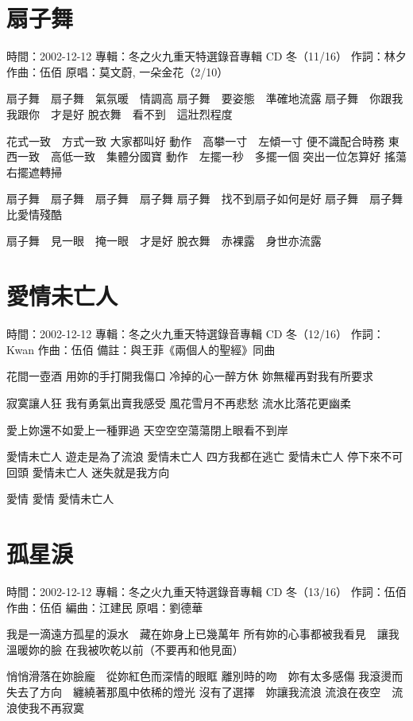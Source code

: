 \documentclass[UTF8,a4paper,oneside,twocolumn,12pt]{ctexbook}
\newcommand{\infopair}[2]{\textbullet #1：#2}
\newcommand{\zc}[1][伍佰]{\infopair{作詞}{#1}}
\newcommand{\zq}[1][伍佰]{\infopair{作曲}{#1}}
\newcommand{\bq}[1][伍佰]{\infopair{編曲}{#1}}
\newcommand{\zj}[1]{\infopair{專輯}{#1}}
\newcommand{\yc}[1]{\infopair{原唱}{#1}}
\newcommand{\sj}[1]{\infopair{時間}{#1}}
\newcommand{\bz}[1]{\infopair{備註}{#1}}
\newenvironment{info}{\begin{flushleft}\kaishu
	}
	{\end{flushleft}\normalsize\yahei\par}
\newenvironment{lyric}{
	}
{}
\begin{document}
\section{扇子舞}
\begin{info}
	\sj{2002-12-12}
	\zj{冬之火九重天特選錄音專輯 CD 冬（11/16）}
	\zc[林夕]
	\zq
	\yc{莫文蔚, 一朵金花（2/10）}
\end{info}
\begin{lyric}
	扇子舞　扇子舞　氣氛暖　情調高
	扇子舞　要姿態　準確地流露
	扇子舞　你跟我　我跟你　才是好
	脫衣舞　看不到　這壯烈程度

	花式一致　方式一致 大家都叫好
	動作　高攀一寸　左傾一寸 便不識配合時務
	東西一致　高低一致　集體分國寶
	動作　左擺一秒　多擺一個 突出一位怎算好
	搖蕩右擺遮轉掃

	扇子舞　扇子舞　扇子舞　扇子舞
	扇子舞　找不到扇子如何是好
	扇子舞　扇子舞比愛情殘酷

	扇子舞　見一眼　掩一眼　才是好
	脫衣舞　赤裸露　身世亦流露
\end{lyric}

\section{愛情未亡人}
\begin{info}
	\sj{2002-12-12}
	\zj{冬之火九重天特選錄音專輯 CD 冬（12/16）}
	\zc[Kwan]
	\zq
	\bz{與王菲《兩個人的聖經》同曲}
\end{info}
\begin{lyric}
	花間一壺酒 用妳的手打開我傷口
	冷掉的心一醉方休 妳無權再對我有所要求

	寂寞讓人狂 我有勇氣出賣我感受
	風花雪月不再悲愁 流水比落花更幽柔

	愛上妳還不如愛上一種罪過
	天空空空蕩蕩閉上眼看不到岸

	愛情未亡人 遊走是為了流浪
	愛情未亡人 四方我都在逃亡
	愛情未亡人 停下來不可回頭
	愛情未亡人 迷失就是我方向

	愛情 愛情 愛情未亡人
\end{lyric}

\section{孤星淚}
\begin{info}
	\sj{2002-12-12}
	\zj{冬之火九重天特選錄音專輯 CD 冬（13/16）}
	\zc
	\zq
	\bq[江建民]
	\yc{劉德華}
\end{info}
\begin{lyric}
	我是一滴遠方孤星的淚水　藏在妳身上已幾萬年
	所有妳的心事都被我看見　讓我溫暖妳的臉
	在我被吹乾以前（不要再和他見面）

	悄悄滑落在妳臉龐　從妳紅色而深情的眼眶
	離別時的吻　妳有太多感傷
	我滾燙而失去了方向　纏繞著那風中依稀的燈光
	沒有了選擇　妳讓我流浪
	流浪在夜空　流浪使我不再寂寞
\end{lyric}
\end{document}
